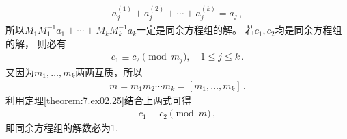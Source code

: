 \begin{prove}
    \begin{align}
        a_j^{(1)}+a_j^{(2)}+\cdots+a_j^{(k)}=a_j\, ,
    \end{align}
    所以$M_1M_1^{-1}a_1+\cdots+M_kM_k^{-1}a_k$一定是同余方程组的解。
    若$c_1,c_2$均是同余方程组的解，
    则必有
    \begin{align}
        c_1\equiv c_2\pmod{m_j},\quad 1\le j\le k\, .
    \end{align}
    又因为$m_1,\ldots,m_k$两两互质，所以
    \begin{align}
        m=m_1m_2\cdots m_k=[m_1,\ldots,m_k]\, .
    \end{align}
    利用定理\ref{theorem:7.ex02.25}结合上两式可得
    \begin{align}
        c_1\equiv c_2\pmod{m}\, ,
    \end{align}
    即同余方程组的解数必为1.
\end{prove}
